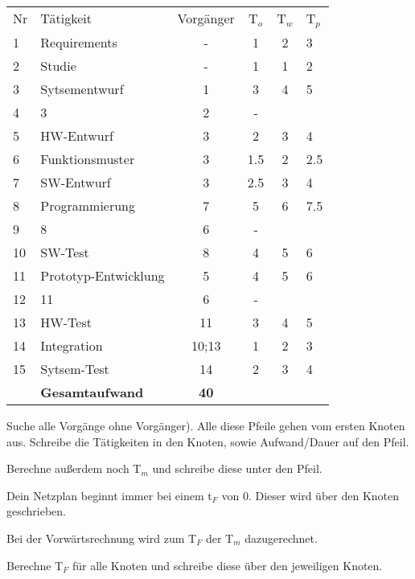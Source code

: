 \documentclass{beamer}
\begin{document}
\begin{frame}[t,shrink=65]
{    \begin{tabular}{l|lcccl}
      \hline
    Nr & Tätigkeit & Vorgänger & T$_{o}$ & T$_{w}$ & T$_{p}$ \\
     1  & Requirements & - & 1 & 2 & 3  \\
     2  & Studie & - & 1 & 1 & 2  \\
     3  & Sytsementwurf & 1 & 3 & 4  & 5  \\
     4  & 3 & 2 & -  \\
     5  & HW-Entwurf& 3 & 2 & 3 & 4 \\
     6  & Funktionsmuster  & 3 & 1.5  & 2 & 2.5 \\
     7  & SW-Entwurf  & 3 & 2.5  & 3 & 4 \\
     8  & Programmierung & 7 & 5 & 6 & 7.5 \\
     9  & 8  & 6 & -  \\
    10  & SW-Test & 8 &  4 & 5& 6 \\
    11  & Prototyp-Entwicklung & 5 & 4 & 5 & 6  \\
	12  & 11  & 6 & - & & \\
	13  & HW-Test  & 11 & 3 & 4 & 5 \\
	14  & Integration & 10;13 & 1 & 2 & 3 \\
	15  & Sytsem-Test & 14 & 2 & 3 & 4 \\
      \hline
        & \textbf{Gesamtaufwand} & \textbf{40}  \\
    \end{tabular}
}

\par\vspace{1cm}\noindent 
\begin{itemize}
{\huge 
	\item<only@+> {Suche alle Vorgänge ohne Vorgänger). Alle diese Pfeile gehen vom ersten Knoten aus. Schreibe die Tätigkeiten in den Knoten, sowie Aufwand/Dauer auf den Pfeil.}
	
	\item<only@+> {Berechne außerdem noch T$_{m}$ und schreibe diese unter den Pfeil.}
	
	 \item<only@+> {Dein Netzplan beginnt immer bei einem t$_{F}$ von 0. Dieser wird über den Knoten geschrieben.}
	  
	  \item<only@+> {Bei der Vorwärtsrechnung wird zum T$_{F}$  der T$_{m}$ dazugerechnet.}
	  
	  \item<only@+> {Berechne T$_{F}$ für alle Knoten und schreibe diese über den jeweiligen Knoten.}
	  
}
\end{itemize}
\end{frame}
\end{document}
